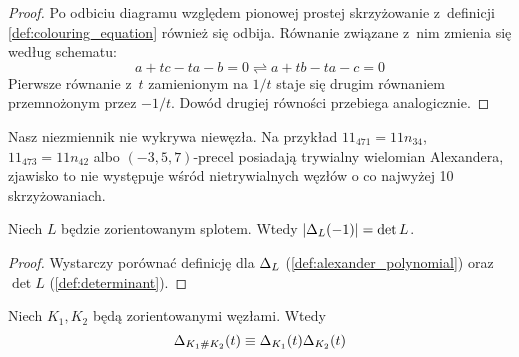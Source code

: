 \begin{proof}
    Po odbiciu diagramu względem pionowej prostej skrzyżowanie z~definicji \ref{def:colouring_equation} również się odbija.
    Równanie związane z~nim zmienia się według schematu:
    \begin{equation}
        a + tc - ta - b = 0 \rightleftharpoons a + tb - ta - c = 0
    \end{equation}
    Pierwsze równanie z~$t$ zamienionym na $1/t$ staje się drugim równaniem przemnożonym przez $-1/t$.
    Dowód drugiej równości przebiega analogicznie.
\end{proof}

Nasz niezmiennik nie wykrywa niewęzła.
Na przykład $11_{471} = 11n_{34}$, $11_{473} = 11n_{42}$ albo $(-3, 5, 7)$-precel posiadają trywialny wielomian Alexandera, zjawisko to nie występuje wśród nietrywialnych węzłów o co najwyżej 10 skrzyżowaniach.

\begin{proposition}
    \label{prp:alexander_determinant}
    Niech $L$ będzie zorientowanym splotem.
    Wtedy $|\Delta_L(-1)| = \det L$.
\end{proposition}

\begin{proof}
    Wystarczy porównać definicję dla $\Delta_L$ (\ref{def:alexander_polynomial}) oraz $\det L$ (\ref{def:determinant}).
\end{proof}

\begin{proposition}
    \label{prp:alexander_multiplicative}
    Niech $K_1, K_2$ będą zorientowanymi węzłami.
    Wtedy
    \begin{equation}
        \Delta_{K_1 \mathbin{\#} K_2}(t) \equiv \Delta_{K_1}(t) \Delta_{K_2}(t)
    \end{equation}
\end{proposition}

